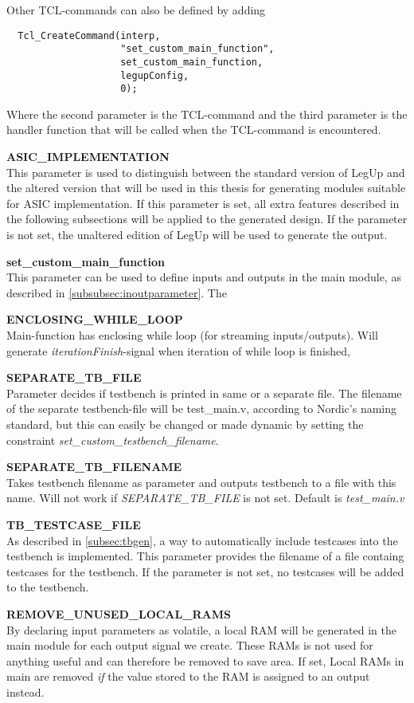 Other TCL-commands can also be defined by adding 
\begin{lstlisting}
  Tcl_CreateCommand(interp,
                    "set_custom_main_function",
                    set_custom_main_function,
                    legupConfig,
                    0);
\end{lstlisting}
Where the second parameter is the TCL-command and the third parameter is the handler function that will be called when the TCL-command is encountered.

\begin{description}
\item{\textbf{ASIC\_IMPLEMENTATION}} \hfill \\
This parameter is used to distinguish between the standard version of LegUp and the altered version that will be used in this thesis for generating modules suitable for ASIC implementation. If this parameter is set, all extra features described in the following subsections will be applied to the generated design. If the parameter is not set, the unaltered edition of LegUp will be used to generate the output.
\item{\textbf{set\_custom\_main\_function}} \hfill \\
This parameter can be used to define inputs and outputs in the main module, as described in \cref{subsubsec:inoutparameter}. The  
\item{\textbf{ENCLOSING\_WHILE\_LOOP}} \hfill \\
Main-function has enclosing while loop (for streaming inputs/outputs). Will generate \textit{iterationFinish}-signal when iteration of while loop is finished,
\item{\textbf{SEPARATE\_TB\_FILE}} \hfill \\
Parameter decides if testbench is printed in same or a separate file. The filename of the separate testbench-file will be test\_main.v, according to Nordic's naming standard, but this can easily be changed or made dynamic by setting the constraint \textit{set\_custom\_testbench\_filename}.
\item{\textbf{SEPARATE\_TB\_FILENAME}} \hfill \\
Takes testbench filename as parameter and outputs testbench to a file with this name. Will not work if \textit{SEPARATE\_TB\_FILE} is not set. Default is \textit{test\_main.v}
\item{\textbf{TB\_TESTCASE\_FILE}} \hfill \\
As described in \cref{subsec:tbgen}, a way to automatically include testcases into the testbench is implemented. This parameter provides the filename of a file containg testcases for the testbench. If the parameter is not set, no testcases will be added to the testbench.
\item{\textbf{REMOVE\_UNUSED\_LOCAL\_RAMS}} \hfill \\
By declaring input parameters as volatile, a local RAM will be generated in the main module for each output signal we create. These RAMs is not used for anything useful and can therefore be removed to save area. If set, Local RAMs in main are removed \textit{if} the value stored to the RAM is assigned to an output instead.
\end{description}
